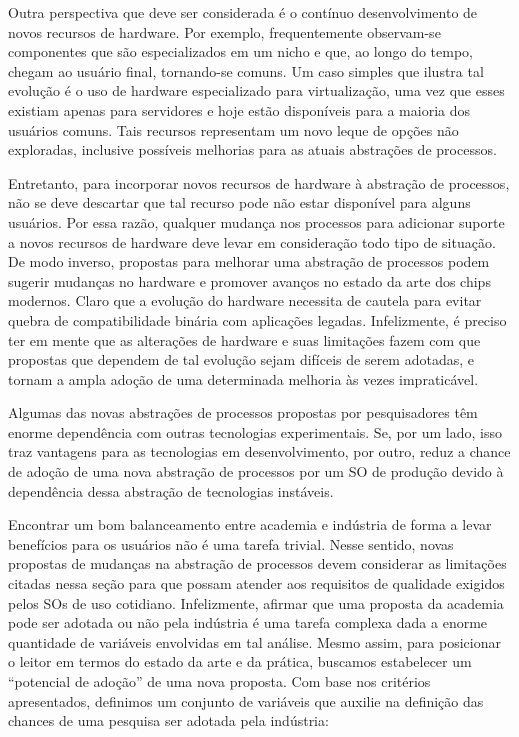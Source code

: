 Outra perspectiva que deve ser considerada é o contínuo desenvolvimento de novos
recursos de hardware. Por exemplo, frequentemente observam-se componentes que
são especializados em um nicho e que, ao longo do tempo, chegam ao usuário
final, tornando-se comuns. Um caso simples que ilustra tal evolução é o
uso de hardware especializado para virtualização, uma vez que esses existiam
apenas para servidores e hoje estão disponíveis para a maioria dos usuários
comuns. Tais recursos representam um novo leque de opções não exploradas,
inclusive possíveis melhorias para as atuais abstrações de processos.

Entretanto, para incorporar novos recursos de hardware à abstração de processos,
não se deve descartar que tal recurso pode não estar disponível para alguns
usuários. Por essa razão, qualquer mudança nos processos para adicionar suporte
a novos recursos de hardware deve levar em consideração todo tipo de situação.
De modo inverso, propostas para melhorar uma abstração de processos podem
sugerir mudanças no hardware e promover avanços no estado da arte dos chips
modernos. Claro que a evolução do hardware necessita de cautela para evitar
quebra de compatibilidade binária com aplicações legadas. Infelizmente, é
preciso ter em mente que as alterações de hardware e suas limitações fazem com
que propostas que dependem de tal evolução sejam difíceis de serem adotadas, e
tornam a ampla adoção de uma determinada melhoria às vezes impraticável.

Algumas das novas abstrações de processos propostas por pesquisadores têm
enorme dependência com outras tecnologias experimentais. Se, por um lado, isso
traz vantagens para as tecnologias em desenvolvimento, por outro, reduz a chance
de adoção de uma nova abstração de processos por um SO de produção devido à
dependência dessa abstração de tecnologias instáveis.

Encontrar um bom balanceamento entre academia e indústria de forma a levar
benefícios para os usuários não é uma tarefa trivial. Nesse sentido, novas
propostas de mudanças na abstração de processos devem considerar as limitações
citadas nessa seção para que possam atender aos requisitos de qualidade
exigidos pelos SOs de uso cotidiano. Infelizmente, afirmar que uma proposta da
academia pode ser adotada ou não pela indústria é uma tarefa complexa dada a
enorme quantidade de variáveis envolvidas em tal análise. Mesmo assim, para
posicionar o leitor em termos do estado da arte e da prática, buscamos
estabelecer um ``potencial de adoção'' de uma nova proposta. Com base nos
critérios apresentados, definimos um conjunto de variáveis que auxilie
na definição das chances de uma pesquisa ser adotada pela indústria:

